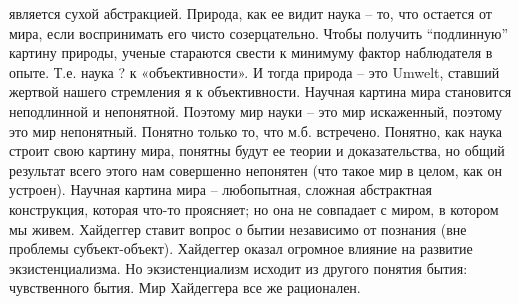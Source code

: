\documentclass[12pt]{article}
\begin{document}
является сухой абстракцией. Природа, как ее видит наука – то, что остается от мира, если воспринимать его
чисто созерцательно. Чтобы получить “подлинную” картину природы, ученые стараются свести к минимуму
фактор наблюдателя в опыте. Т.е. наука ? к «объективности». И тогда природа – это Umwelt, ставший жертвой
нашего стремления я к объективности. Научная картина мира становится неподлинной и непонятной.
Поэтому мир науки – это мир искаженный, поэтому это мир непонятный. Понятно только то, что м.б. встречено.
Понятно, как наука строит свою картину мира, понятны будут ее теории и доказательства, но общий результат
всего этого нам совершенно непонятен (что такое мир в целом, как он устроен). Научная картина мира –
любопытная, сложная абстрактная конструкция, которая что-то проясняет; но она не совпадает с миром, в
котором мы живем.
Хайдеггер ставит вопрос о бытии независимо от познания (вне проблемы субъект-объект).
Хайдеггер оказал огромное влияние на развитие экзистенциализма. Но экзистенциализм исходит из другого
понятия бытия: чувственного бытия.
Мир Хайдеггера все же рационален.


\newpage
\end{document}

